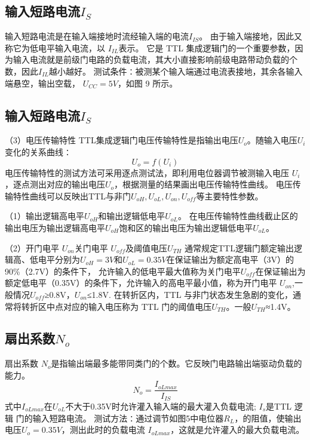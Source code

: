 \documentclass{article}
\begin{document}
            \subsection{输入短路电流$I_S$}
            输入短路电流是在输入端接地时流经输入端的电流$ I_{IS}$。 由于输入端接地，因此又称它为低电平输入电流，以 $I_{IL}$表示。
            它是 TTL 集成逻辑门的一个重要参数，因为输入电流就是前级门电路的负载电流，其大小直接影响前级电路带动负载的个数，因此$I_{IL}$越小越好。
            测试条件∶被测某个输入端通过电流表接地，其余各输入端悬空，输出空载， $U_{CC} =5V$，如图 9 所示。

            \subsection{输入短路电流$I_S$}
            （3）电压传输特性
             TTL集成逻辑门电压传输特性是指输出电压$U_o$。随输入电压$U_i$变化的关系曲线∶
          \[U_o=f(U_i)\]
电压传输特性的测试方法可采用逐点测试法，即利用电位器调节被测输入电压 $U_i$，逐点测出对应的输出电压$U_o$，根据测量的结果画出电压传输特性曲线。
电压传输特性曲线可以反映出TTL与非门$U_{oH},U_{oL},U_{on},U_{off}$等主要特性参数。\par
（1）输出逻辑高电平$U_{oH}$和输出逻辑低电平$U_{oL}$。
在电压传输特性曲线截止区的输出电压为输出逻辑高电平$U_{oH}$饱和区的输出电压为输出逻辑低电平$U_{oL}$。\par
（2）开门电平 $U_{on}$关门电平 $U_{off}$及阈值电压$U_{TH}$
通常规定TTL逻辑门额定输出逻辑高、低电平分别为$U_{oH}=3V$和$U_{oL}=0.35V$在保证输出为额定高电平（3V）的90\%（2.7V）的条件下，
允许输入的低电平最大值称为关门电平$U_{off}$在保证输出为额定低电平（0.35V）的条件下，允许输入的高电平最小值，称为开门电平 $U_{on}$,一般情况$U_{off}$≥0.8V，$U_{on}$≤1.8V.
在转折区内，TTL 与非门状态发生急剧的变化，通常将转折区中点对应的输入电压称为 TTL 门的阈值电压$ U_{TH}$。一般$ U_{TH}$≈1.4V。


\subsection{扇出系数$N_o$}
扇出系数 $N_o$是指输出端最多能带同类门的个数。它反映门电路输出端驱动负载的能力。 \[N_o=\frac{I_{oLmax}}{I_{IS}}\]
式中$I_{oLmax}$在$U_{oL}$不大于0.35V时允许灌入输入端的最大灌入负载电流;
$I_s$是TTL 逻辑 门的输入短路电流。
测试方法∶通过调节如图5中电位器$ R_L$，的阻值，使输出电压$U_o=0.35V$，测出此时的负载电流 $I_{oLmax}$，这就是允许灌入的最大负载电流。
\end{document}
